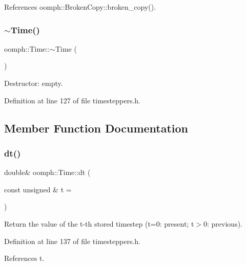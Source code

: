 References oomph\+::\+Broken\+Copy\+::broken\+\_\+copy().

\mbox{\label{classoomph_1_1Time_aeed85387263214e97be21e075a06371c}} 
\subsubsection{\texorpdfstring{$\sim$\+Time()}{~Time()}}
{\footnotesize\ttfamily oomph\+::\+Time\+::$\sim$\+Time (\begin{DoxyParamCaption}{ }\end{DoxyParamCaption})\hspace{0.3cm}{\ttfamily [inline]}}



Destructor\+: empty. 



Definition at line 127 of file timesteppers.\+h.



\subsection{Member Function Documentation}
\mbox{\label{classoomph_1_1Time_a2c684e0a69db7adde90f1f052e424a6b}} 
\subsubsection{\texorpdfstring{dt()}{dt()}\hspace{0.1cm}{\footnotesize\ttfamily [1/2]}}
{\footnotesize\ttfamily double\& oomph\+::\+Time\+::dt (\begin{DoxyParamCaption}\item[{const unsigned \&}]{t = {} }\end{DoxyParamCaption})\hspace{0.3cm}{\ttfamily [inline]}}

Return the value of the t-\/th stored timestep (t=0\+: present; t$>$0\+: previous). 

Definition at line 137 of file timesteppers.\+h.



References t.




